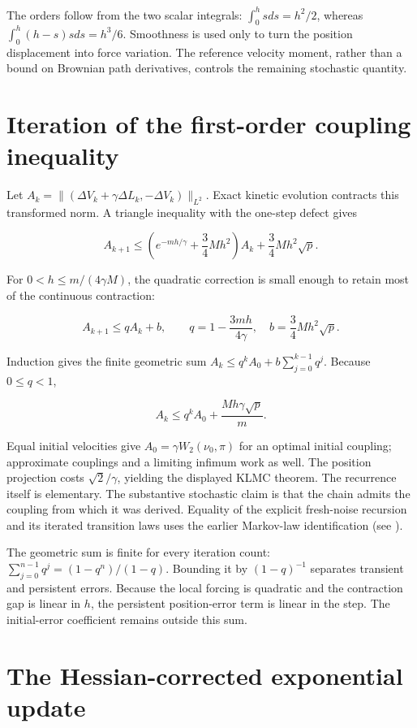 \documentclass[11pt,a4paper]{report}
\begin{document}
The orders follow from the two scalar integrals: \(\int_0^hsds=h^2/2\), whereas \(\int_0^h(h-s)sds=h^3/6\). Smoothness is used only to turn the position displacement into force variation. The reference velocity moment, rather than a bound on Brownian path derivatives, controls the remaining stochastic quantity.

\section{\texorpdfstring{Iteration of the first-order coupling inequality}{Iteration of the first-order coupling inequality}}


Let
\(A_k=\| (\Delta V_k+\gamma\Delta L_k,-\Delta V_k)\|_{L^2}\).
Exact kinetic evolution contracts this transformed norm. A triangle inequality
with the one-step defect gives


\[A_{k+1}\le\left(e^{-mh/\gamma}+\frac34Mh^2\right)A_k
+\frac34Mh^2\sqrt p.\]


For \(0<h\le m/(4\gamma M)\), the quadratic correction is small enough
to retain most of the continuous contraction:


\[A_{k+1}\le qA_k+b,\qquad
q=1-\frac{3mh}{4\gamma},\quad b=\frac34Mh^2\sqrt p.\]


Induction gives the finite geometric sum
\(A_k\le q^kA_0+b\sum_{j=0}^{k-1}q^j\). Because \(0\le q<1\),


\[A_k\le q^kA_0+\frac{Mh\gamma\sqrt p}m.\]


Equal initial velocities give \(A_0=\gamma W_2(\nu_0,\pi)\) for an
optimal initial coupling; approximate couplings and a limiting infimum work as
well. The position projection costs \(\sqrt2/\gamma\), yielding the displayed
KLMC theorem. The recurrence itself is elementary. The substantive stochastic
claim is that the chain admits the coupling from which it was derived. Equality of the explicit fresh-noise recursion and its iterated transition laws uses the earlier Markov-law identification (see \cite[Section~3.33.12]{LangevinLean2026ULASC}).



The geometric sum is finite for every iteration count: \(\sum_{j=0}^{n-1}q^j=(1-q^n)/(1-q)\). Bounding it by \((1-q)^{-1}\) separates transient and persistent errors. Because the local forcing is quadratic and the contraction gap is linear in \(h\), the persistent position-error term is linear in the step. The initial-error coefficient remains outside this sum.

\section{\texorpdfstring{The Hessian-corrected exponential update}{The Hessian-corrected exponential update}}
\end{document}
